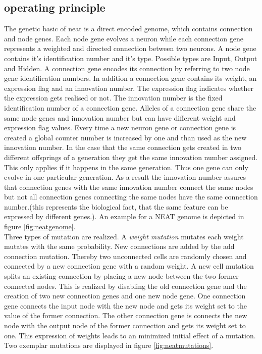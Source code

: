\subsection{operating principle} 
The genetic basic of \gls{neat} is a direct encoded genome, which contains connection and node genes. Each node gene evolves a neuron while each connection gene represents a weighted and directed connection between two neurons. A node gene contains it's identification number and it's type. Possible types are Input, Output and Hidden. A connection gene encodes its connection by referring to two node gene identification numbers. In addition a connection gene contains its weight, an expression flag and an innovation number. The expression flag indicates whether the expression gets realised or not. The innovation number is the fixed identification number of a connection gene. Alleles of a connection gene share the same node genes and innovation number but can have different weight and expression flag values. Every time a new neuron gene or connection gene is created a global counter number is increased by one and than used as the new innovation number. In the case that the same connection gets created in two different offsprings of a generation they get the same innovation number assigned. This only applies if it happens in the same generation. Thus one gene can only evolve in one particular generation. As a result the innovation number assures that connection genes with the same innovation number connect the same nodes but not all connection genes connecting the same nodes have the same connection number.(this represents the biological fact, that the same feature can be expressed by different genes.). An example for a NEAT genome is depicted in figure \ref{fig:neatgenome}.\\
Three types of mutation are realized. A \textit{weight mutation} mutates each weight mutates with the same probability. New connections are added by the add connection mutation. Thereby two unconnected cells are randomly chosen and connected by a new connection gene with a random weight. A new cell mutation splits an existing connection by placing a new node between the two former connected nodes. This is realized by disabling the old connection gene and the creation of two new connection genes and one new node gene. One connection gene connects the input node with the new node and gets its weight set to the value of the former connection. The other connection gene is connects the new node with the output node of the former connection and gets its weight set to one. This expression of weights leads to an minimized initial effect of a mutation. Two exemplar mutations are displayed in figure \ref{fig:neatmutations}.\\
